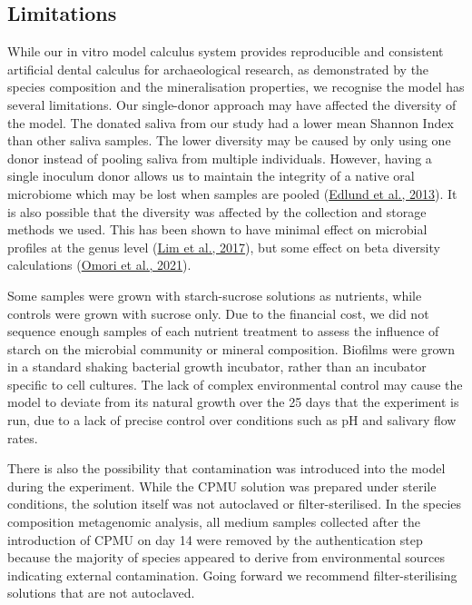 \documentclass[
  letterpaper,
]{book}
\begin{document}
\hypertarget{limitations}{%
\subsection{Limitations}\label{limitations}}

While our in vitro model calculus system provides reproducible and
consistent artificial dental calculus for archaeological research, as
demonstrated by the species composition and the mineralisation
properties, we recognise the model has several limitations. Our
single-donor approach may have affected the diversity of the model. The
donated saliva from our study had a lower mean Shannon Index than other
saliva samples. The lower diversity may be caused by only using one
donor instead of pooling saliva from multiple individuals. However,
having a single inoculum donor allows us to maintain the integrity of a
native oral microbiome which may be lost when samples are pooled
(\protect\hyperlink{ref-edlundBiofilmModel2013}{Edlund et al., 2013}).
It is also possible that the diversity was affected by the collection
and storage methods we used. This has been shown to have minimal effect
on microbial profiles at the genus level
(\protect\hyperlink{ref-limSalivaMicrobiome2017}{Lim et al., 2017}), but
some effect on beta diversity calculations
(\protect\hyperlink{ref-omoriComparativeEvaluation2021}{Omori et al.,
2021}).

Some samples were grown with starch-sucrose solutions as nutrients,
while controls were grown with sucrose only. Due to the financial cost,
we did not sequence enough samples of each nutrient treatment to assess
the influence of starch on the microbial community or mineral
composition. Biofilms were grown in a standard shaking bacterial growth
incubator, rather than an incubator specific to cell cultures. The lack
of complex environmental control may cause the model to deviate from its
natural growth over the 25 days that the experiment is run, due to a
lack of precise control over conditions such as pH and salivary flow
rates.

There is also the possibility that contamination was introduced into the
model during the experiment. While the CPMU solution was prepared under
sterile conditions, the solution itself was not autoclaved or
filter-sterilised. In the species composition metagenomic analysis, all
medium samples collected after the introduction of CPMU on day 14 were
removed by the authentication step because the majority of species
appeared to derive from environmental sources indicating external
contamination. Going forward we recommend filter-sterilising solutions
that are not autoclaved.
\end{document}
